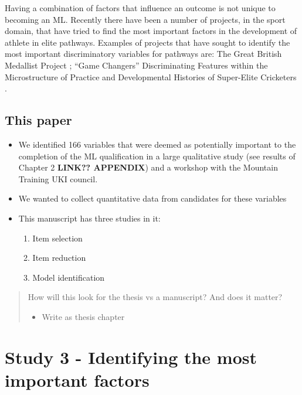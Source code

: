 \documentclass[a4paper,]{book}
\providecommand{\tightlist}{%
  \setlength{\itemsep}{0pt}\setlength{\parskip}{0pt}}
\begin{document}
Having a combination of factors that influence an outcome is not unique to becoming an ML. Recently there have been a number of projects, in the sport domain, that have tried to find the most important factors in the development of athlete in elite pathways. Examples of projects that have sought to identify the most important discriminatory variables for pathways are: The Great British Medallist Project \citep[GBM;][]{Gullich2019, Hardy2017, Rees2016}; ``Game Changers'' Discriminating Features within the Microstructure of Practice and Developmental Histories of Super-Elite Cricketers \citep{Jones2019a, Jones2019b}.

\hypertarget{this-paper}{%
\subsection{This paper}\label{this-paper}}

\begin{itemize}
\tightlist
\item
  We identified 166 variables that were deemed as potentially important to the completion of the ML qualification in a large qualitative study (see results of Chapter 2 \textbf{LINK?? APPENDIX}) and a workshop with the Mountain Training UKI council.
\item
  We wanted to collect quantitative data from candidates for these variables
\item
  This manuscript has three studies in it:

  \begin{enumerate}
  \def\labelenumi{\arabic{enumi})}
  \tightlist
  \item
    Item selection
  \item
    Item reduction
  \item
    Model identification
  \end{enumerate}
\end{itemize}

\begin{quote}
How will this look for the thesis vs a manuscript? And does it matter?

\begin{itemize}
\tightlist
\item
  Write as thesis chapter
\end{itemize}
\end{quote}

\hypertarget{study-3---identifying-the-most-important-factors}{%
\section{Study 3 - Identifying the most important factors}\label{study-3---identifying-the-most-important-factors}}
\end{document}
